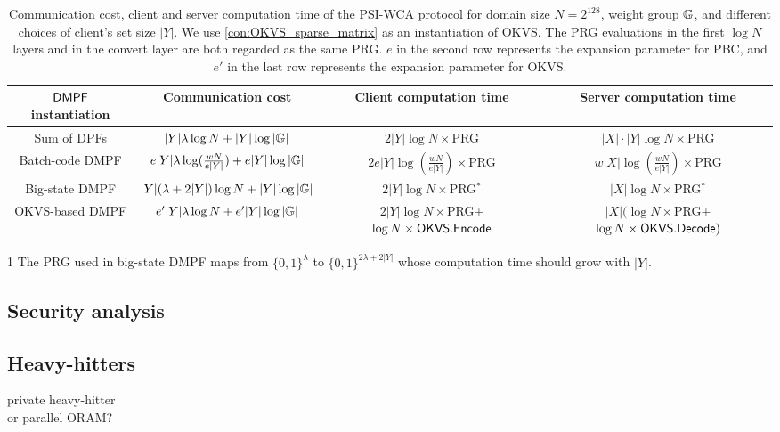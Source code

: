 \begin{table*}
  \renewcommand\arraystretch{1.5}
  \begin{threeparttable}
  \caption{Communication cost, client and server computation time of the PSI-WCA protocol for domain size $N = 2^{128}$, weight group $\mathbb{G}$, and  different choices of client's set size $|Y|$. We use \cref{con:OKVS_sparse_matrix} as an instantiation of OKVS. The PRG evaluations in the first $\log N$ layers and in the convert layer are both regarded as the same PRG. $e$ in the second row represents the expansion parameter for PBC, and $e'$ in the last row represents the expansion parameter for OKVS. }
\label{tab:PSI_plug_in_formula}
  \begin{tabular}{cccc}
          \toprule
    ${\sf DMPF}$ instantiation & Communication cost & Client computation time & Server computation time \\
          \midrule

          Sum of DPFs & $|Y|\lambda\log N+|Y|\log|\mathbb{G}|$ & $2|Y|\log N\times $PRG & $|X|\cdot |Y|\log N\times $PRG\\

          Batch-code DMPF & $e|Y|\lambda\log(\frac{wN}{e|Y|})+e|Y|\log|\mathbb{G}|$ & $2e|Y|\log(\frac{wN}{e|Y|})\times$PRG & $w|X|\log(\frac{wN}{e|Y|})\times$PRG\\

          Big-state DMPF & $|Y|(\lambda+2|Y|)\log N+|Y|\log|\mathbb{G}|$ & $2|Y|\log N\times $PRG$^*$\tnote{1} & $|X|\log N \times$PRG$^*$\\

          OKVS-based DMPF& $e'|Y|\lambda\log N +e'|Y|\log|\mathbb{G}|$ & $2|Y|\log N\times$PRG+$\log N\times {\sf OKVS}.{\sf Encode}$ & $|X|(\log N\times$PRG+$\log N\times {\sf OKVS}.{\sf Decode})$\\
          \bottomrule
  \end{tabular}
  \begin{tablenotes}
    \item [1] The PRG used in big-state DMPF maps from $\{0,1\}^\lambda$ to $\{0,1\}^{2\lambda+2|Y|}$ whose computation time should grow with $|Y|$.
  \end{tablenotes}
\end{threeparttable}
\end{table*}



\subsection{Security analysis}
\subsection{Heavy-hitters}
private heavy-hitter\\
or parallel ORAM?